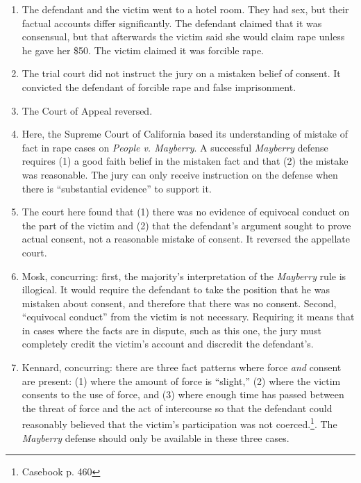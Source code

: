 \begin{enumerate}
    \item The defendant and the victim went to a hotel room. They had sex, but 
    their factual accounts differ significantly. The defendant claimed that it 
    was consensual, but that afterwards the victim said she would claim rape 
    unless he gave her \$50. The victim claimed it was forcible rape.
    \item The trial court did not instruct the jury on a mistaken belief of 
    consent. It convicted the defendant of forcible rape and false 
    imprisonment.
    \item The Court of Appeal reversed.
    \item Here, the Supreme Court of California based its understanding of 
    mistake of fact in rape cases on \emph{People v. Mayberry}. A successful 
    \emph{Mayberry} defense requires (1) a good faith belief in the mistaken 
    fact and that (2) the mistake was reasonable. The jury can only receive 
    instruction on the defense when there is ``substantial evidence'' to 
    support it.
    \item The court here found that (1) there was no evidence of equivocal 
    conduct on the part of the victim and (2) that the defendant's argument 
    sought to prove actual consent, not a reasonable mistake of consent. It 
    reversed the appellate court.
    \item Mosk, concurring: first, the majority's interpretation of the 
    \emph{Mayberry} rule is illogical. It would require the defendant to take 
    the position that he was mistaken about consent, and therefore that there 
    was no consent. Second, ``equivocal conduct'' from the victim is not 
    necessary. Requiring it means that in cases where the facts are in 
    dispute, such as this one, the jury must completely credit the victim's 
    account and discredit the defendant's.
    \item Kennard, concurring: there are three fact patterns where force 
    \emph{and} consent are present: (1) where the amount of force is 
    ``slight,'' (2) where the victim consents to the use of force, and (3) 
    where enough time has passed between the threat of force and the act of 
    intercourse so that the defendant could reasonably believed that the 
    victim's participation was not coerced.\footnote{Casebook p. 460}. The 
    \emph{Mayberry} defense should only be available in these three cases.
\end{enumerate}

